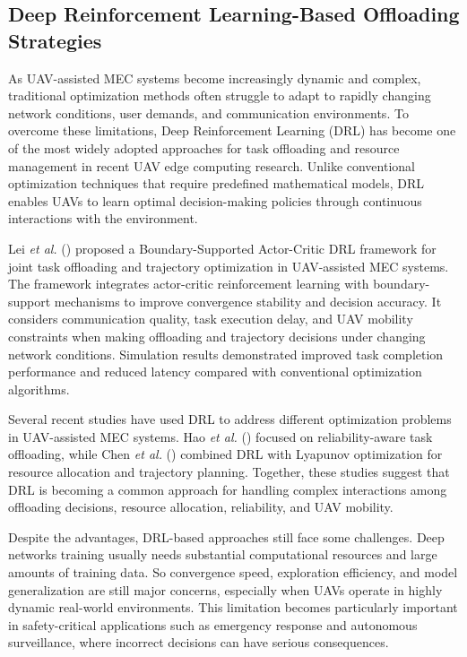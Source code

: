 \documentclass[a4paper, 12pt]{article}
\begin{document}
\subsection*{Deep Reinforcement Learning-Based Offloading Strategies}
As UAV-assisted MEC systems become increasingly dynamic and complex, traditional optimization methods often struggle to adapt to rapidly changing network conditions, user demands, and communication environments. To overcome these limitations, Deep Reinforcement Learning (DRL) has become one of the most widely adopted approaches for task offloading and resource management in recent UAV edge computing research. Unlike conventional optimization techniques that require predefined mathematical models, DRL enables UAVs to learn optimal decision-making policies through continuous interactions with the environment.

Lei \textit{et al.} (\cite{Lei2025}) proposed a Boundary-Supported Actor-Critic DRL framework for joint task offloading and trajectory optimization in UAV-assisted MEC systems. The framework integrates actor-critic reinforcement learning with boundary-support mechanisms to improve convergence stability and decision accuracy. It considers communication quality, task execution delay, and UAV mobility constraints when making offloading and trajectory decisions under changing network conditions. Simulation results demonstrated improved task completion performance and reduced latency compared with conventional optimization algorithms.

Several recent studies have used DRL to address different optimization problems in UAV-assisted MEC systems. Hao \textit{et al.} (\cite{Hao2025}) focused on reliability-aware task offloading, while Chen \textit{et al.} (\cite{Chen2025TSC}) combined DRL with Lyapunov optimization for resource allocation and trajectory planning. Together, these studies suggest that DRL is becoming a common approach for handling complex interactions among offloading decisions, resource allocation, reliability, and UAV mobility.

Despite the advantages, DRL-based approaches still face some challenges. Deep networks training usually needs substantial
computational resources and large amounts of training data. So convergence speed, exploration efficiency, and model generalization are still major concerns, especially when UAVs operate in highly dynamic real-world environments. This limitation becomes particularly important in safety-critical applications such as emergency response and autonomous surveillance, where incorrect decisions can have serious consequences.
\end{document}
